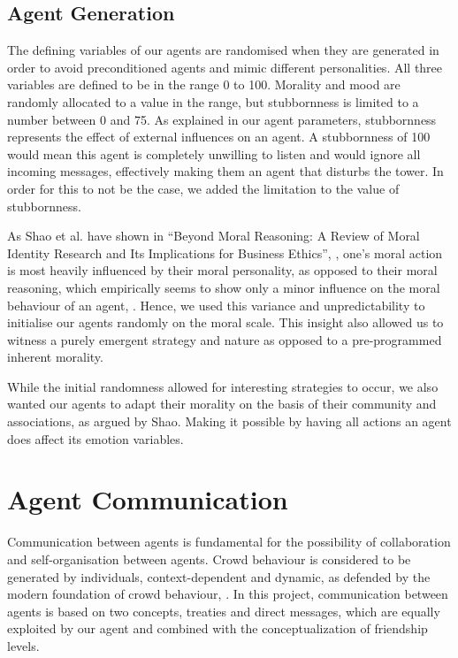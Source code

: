 \subsection{Agent Generation}
The defining variables of our agents are randomised when they are generated in order to avoid preconditioned agents and mimic different personalities. All three variables are defined to be in the range 0 to 100. Morality and mood are randomly allocated to a value in the range, but stubbornness is limited to a number between 0 and 75. As explained in our agent parameters, stubbornness represents the effect of external influences on an agent. A stubbornness of 100 would mean this agent is completely unwilling to listen and would ignore all incoming messages, effectively making them an agent that disturbs the tower. In order for this to not be the case, we added the limitation to the value of stubbornness.\par
As Shao et al. have shown in “Beyond Moral Reasoning: A Review of Moral Identity Research and Its Implications for Business Ethics”, \cite{shao_aquino_freeman_2008}, one’s moral action is most heavily influenced by their moral personality, as opposed to their moral reasoning, which empirically seems to show only a minor influence on the moral behaviour of an agent, \cite{blasi_1983}. Hence, we used this variance and unpredictability to initialise our agents randomly on the moral scale. This insight also allowed us to witness a purely emergent strategy and nature as opposed to a pre-programmed inherent morality.\par
While the initial randomness allowed for interesting strategies to occur, we also wanted our agents to adapt their morality on the basis of their community and associations, as argued by Shao. Making it possible by having all actions an agent does affect its emotion variables. 

\section{Agent Communication}\label{sec:agent_communication}
Communication between agents is fundamental for the possibility of collaboration and self-organisation between agents. Crowd behaviour is considered to be generated by individuals, context-dependent and dynamic, as defended by the modern foundation of crowd behaviour, \cite{0d9bc1ee81234780b2bb6ecd02762d56}. In this project, communication between agents is based on two concepts, treaties and direct messages, which are equally exploited by our agent and combined with the conceptualization of friendship levels. 

